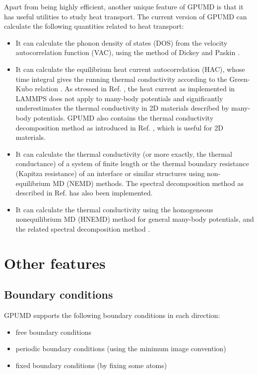 \documentclass[12pt,a4paper]{report}
\begin{document}
Apart from being highly efficient, another unique feature of GPUMD is that it has useful utilities to study heat transport. The current version of GPUMD can calculate the following quantities related to heat transport:
\begin{itemize}
\item It can calculate the phonon density of states (DOS) from the velocity autocorrelation function (VAC), using the method of Dickey and Paskin \cite{dickey1969pr}.
\item It can calculate the equilibrium heat current autocorrelation (HAC), whose time integral gives the running thermal conductivity according to the Green-Kubo relation \cite{green1954jcp,kubo1957jpsj}. As stressed in Ref. \cite{fan2015prb}, the heat current as implemented in LAMMPS \cite{plimpton1995jcp} does not apply to many-body potentials and significantly underestimates the thermal conductivity in 2D materials described by many-body potentials. GPUMD also contains the thermal conductivity decomposition method as introduced in Ref. \cite{fan2017prb}, which is useful for 2D materials.
\item It can calculate the thermal conductivity (or more exactly, the thermal conductance) of a system of finite length or the thermal boundary resistance (Kapitza resistance) of an interface or similar structures using non-equilibrium MD (NEMD) methods. The spectral decomposition method as described in Ref. \cite{fan2017prb} has also been implemented.
\item It can calculate the thermal conductivity using the homogeneous nonequilibrium MD (HNEMD) method \cite{evans1982pla} for general many-body potentials, and the related spectral decomposition method \cite{fan2018submitted}.
\end{itemize}

\section{Other features}

\subsection{Boundary conditions}

GPUMD supports the following boundary conditions in each direction:
  \begin{itemize}
  \item free boundary conditions
  \item periodic boundary conditions (using the minimum image convention)
  \item fixed boundary conditions (by fixing some atoms)
  \end{itemize}
\end{document}
